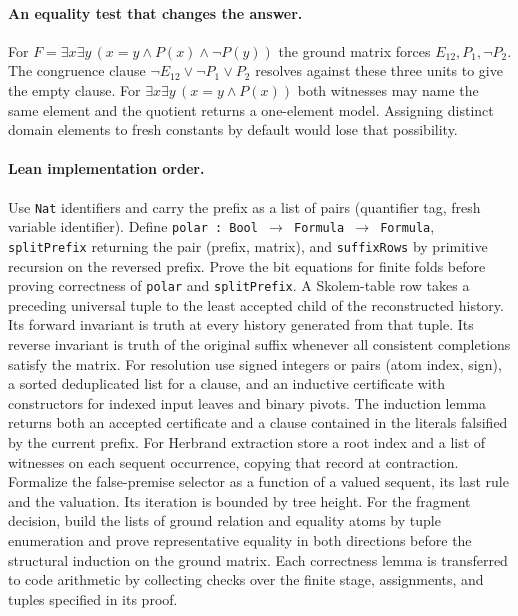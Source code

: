 \paragraph{An equality test that changes the answer.}
For $F=\exists x\exists y\,(x=y\wedge P(x)\wedge\neg P(y))$ the ground matrix forces $E_{12},P_1,\neg P_2$. The congruence clause $\neg E_{12}\vee\neg P_1\vee P_2$ resolves against these three units to give the empty clause. For $\exists x\exists y\,(x=y\wedge P(x))$ both witnesses may name the same element and the quotient returns a one-element model. Assigning distinct domain elements to fresh constants by default would lose that possibility.

\paragraph{Lean implementation order.}
Use \texttt{Nat} identifiers and carry the prefix as a list of pairs (quantifier tag, fresh variable identifier). Define \texttt{polar : Bool $\to$ Formula $\to$ Formula}, \texttt{splitPrefix} returning the pair (prefix, matrix), and \texttt{suffixRows} by primitive recursion on the reversed prefix. Prove the bit equations for finite folds before proving correctness of \texttt{polar} and \texttt{splitPrefix}. A Skolem-table row takes a preceding universal tuple to the least accepted child of the reconstructed history. Its forward invariant is truth at every history generated from that tuple. Its reverse invariant is truth of the original suffix whenever all consistent completions satisfy the matrix. For resolution use signed integers or pairs (atom index, sign), a sorted deduplicated list for a clause, and an inductive certificate with constructors for indexed input leaves and binary pivots. The induction lemma returns both an accepted certificate and a clause contained in the literals falsified by the current prefix. For Herbrand extraction store a root index and a list of witnesses on each sequent occurrence, copying that record at contraction. Formalize the false-premise selector as a function of a valued sequent, its last rule and the valuation. Its iteration is bounded by tree height. For the fragment decision, build the lists of ground relation and equality atoms by tuple enumeration and prove representative equality in both directions before the structural induction on the ground matrix. Each correctness lemma is transferred to code arithmetic by collecting checks over the finite stage, assignments, and tuples specified in its proof.
